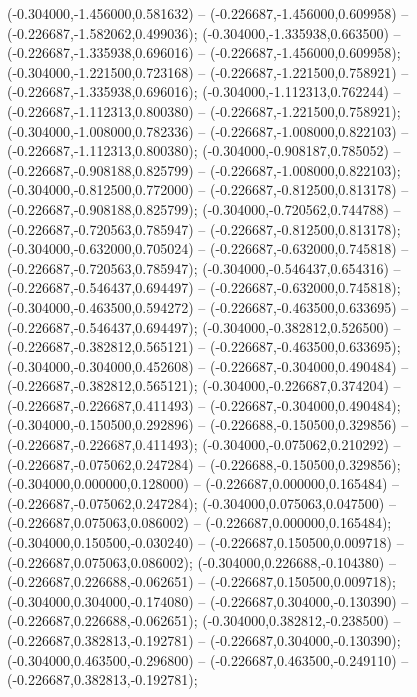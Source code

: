 (-0.304000,-1.456000,0.581632) -- (-0.226687,-1.456000,0.609958) -- (-0.226687,-1.582062,0.499036);
 (-0.304000,-1.335938,0.663500) -- (-0.226687,-1.335938,0.696016) -- (-0.226687,-1.456000,0.609958);
 (-0.304000,-1.221500,0.723168) -- (-0.226687,-1.221500,0.758921) -- (-0.226687,-1.335938,0.696016);
 (-0.304000,-1.112313,0.762244) -- (-0.226687,-1.112313,0.800380) -- (-0.226687,-1.221500,0.758921);
 (-0.304000,-1.008000,0.782336) -- (-0.226687,-1.008000,0.822103) -- (-0.226687,-1.112313,0.800380);
 (-0.304000,-0.908187,0.785052) -- (-0.226687,-0.908188,0.825799) -- (-0.226687,-1.008000,0.822103);
 (-0.304000,-0.812500,0.772000) -- (-0.226687,-0.812500,0.813178) -- (-0.226687,-0.908188,0.825799);
 (-0.304000,-0.720562,0.744788) -- (-0.226687,-0.720563,0.785947) -- (-0.226687,-0.812500,0.813178);
 (-0.304000,-0.632000,0.705024) -- (-0.226687,-0.632000,0.745818) -- (-0.226687,-0.720563,0.785947);
 (-0.304000,-0.546437,0.654316) -- (-0.226687,-0.546437,0.694497) -- (-0.226687,-0.632000,0.745818);
 (-0.304000,-0.463500,0.594272) -- (-0.226687,-0.463500,0.633695) -- (-0.226687,-0.546437,0.694497);
 (-0.304000,-0.382812,0.526500) -- (-0.226687,-0.382812,0.565121) -- (-0.226687,-0.463500,0.633695);
 (-0.304000,-0.304000,0.452608) -- (-0.226687,-0.304000,0.490484) -- (-0.226687,-0.382812,0.565121);
 (-0.304000,-0.226687,0.374204) -- (-0.226687,-0.226687,0.411493) -- (-0.226687,-0.304000,0.490484);
 (-0.304000,-0.150500,0.292896) -- (-0.226688,-0.150500,0.329856) -- (-0.226687,-0.226687,0.411493);
 (-0.304000,-0.075062,0.210292) -- (-0.226687,-0.075062,0.247284) -- (-0.226688,-0.150500,0.329856);
 (-0.304000,0.000000,0.128000) -- (-0.226687,0.000000,0.165484) -- (-0.226687,-0.075062,0.247284);
 (-0.304000,0.075063,0.047500) -- (-0.226687,0.075063,0.086002) -- (-0.226687,0.000000,0.165484);
 (-0.304000,0.150500,-0.030240) -- (-0.226687,0.150500,0.009718) -- (-0.226687,0.075063,0.086002);
 (-0.304000,0.226688,-0.104380) -- (-0.226687,0.226688,-0.062651) -- (-0.226687,0.150500,0.009718);
 (-0.304000,0.304000,-0.174080) -- (-0.226687,0.304000,-0.130390) -- (-0.226687,0.226688,-0.062651);
 (-0.304000,0.382812,-0.238500) -- (-0.226687,0.382813,-0.192781) -- (-0.226687,0.304000,-0.130390);
 (-0.304000,0.463500,-0.296800) -- (-0.226687,0.463500,-0.249110) -- (-0.226687,0.382813,-0.192781);
